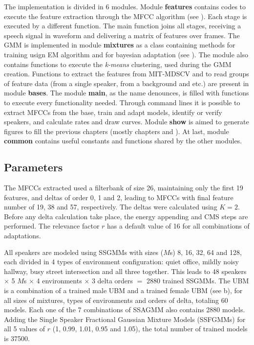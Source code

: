 The implementation is divided in 6 modules. Module \textbf{features} contains codes to execute the feature extraction through the MFCC algorithm (see ). Each stage is executed by a different function. The main function joins all stages, receiving a speech signal in waveform and delivering a matrix of features over frames. The GMM is implemented in module \textbf{mixtures} as a class containing methods for training usign EM algorithm and for bayesian adaptation (see ). The module also contains functions to execute the \emph{k-means} clustering, used during the GMM creation. Functions to extract the features from MIT-MDSCV and to read groups of feature data (from a single speaker, from a background and etc.) are present in module \textbf{bases}. The module \textbf{main}, as the name denounces, is filled with functions to execute every functionality needed. Through command lines it is possible to extract MFCCs from the base, train and adapt models, identify or verify speakers, and calculate rates and draw curves. Module \textbf{show} is aimed to generate figures to fill the previous chapters (mostly chapters  and ). At last, module \textbf{common} contains useful constants and functions shared by the other modules.

\subsection{Parameters}

The MFCCs extracted used a filterbank of size 26, maintaining only the first 19 features, and deltas of order 0, 1 and 2, leading to MFCCs with final feature number of 19, 38 and 57, respectively. The deltas were calculated using $K = 2$. Before any delta calculation take place, the energy appending and CMS steps are performed. The relevance factor $r$ has a default value of 16 for all combinations of adaptations.

All speakers are modeled using SSGMMs with sizes ($M$s) 8, 16, 32, 64 and 128, each divided in 4 types of environment configuration: quiet office, mildly noisy hallway, busy street intersection and all three together. This leads to 48 speakers $\times$ 5 $M$s $\times$ 4 environments $\times$ 3 delta orders $=$ 2880 trained SSGMMs. The UBM is a combination of a trained male UBM and a trained female UBM (see b), for all sizes of mixtures, types of environments and orders of delta, totaling 60 models. Each one of the 7 combinations of SSAGMM also contains 2880 models. Adding the Single Speaker Fractional Gaussian Mixture Models (SSFGMMs) for all 5 values of $r$ (1, 0.99, 1.01, 0.95 and 1.05), the total number of trained models is 37500.

